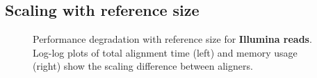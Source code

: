 \subsection{Scaling with reference size} \label{SEEDsec:eval-refsize}

\begin{figure}[t]
    \centering
  \caption[Performance scaling with reference size (short reads)]{Performance
  degradation with reference size for \textbf{Illumina reads}. Log-log plots of
  total alignment time (left) and memory usage (right) show the scaling
  difference between aligners.}
  \label{SEEDfig:illumina_scaling_with_genomesize}
\end{figure}


